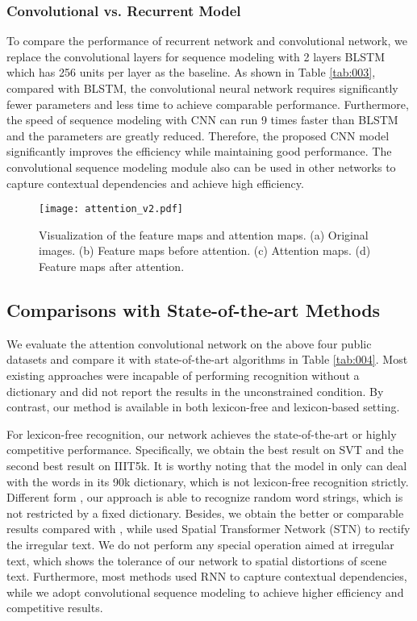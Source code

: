 \documentclass[letterpaper]{article} %
\begin{document}
\subsubsection{Convolutional vs. Recurrent Model}
To compare the performance of recurrent network and convolutional network, we replace the convolutional layers for sequence modeling with 2 layers BLSTM which has 256 units per layer as the baseline. As shown in Table \ref{tab:003}, compared with BLSTM, the convolutional neural network requires significantly fewer parameters and less time to achieve comparable performance. Furthermore, the speed of sequence modeling with CNN can run 9 times faster than BLSTM and the parameters are greatly reduced. Therefore, the proposed CNN model significantly improves the efficiency while maintaining good performance. The convolutional sequence modeling module also can be used in other networks to capture contextual dependencies and achieve high efficiency. \par

\begin{figure}
\centering
\texttt{[image: attention\_v2.pdf]}
\caption{Visualization of the feature maps and attention maps. (a) Original images. (b) Feature maps before attention. (c) Attention maps. (d) Feature maps after attention.}
\label{fig:picture003}
\end{figure}





\subsection{Comparisons with State-of-the-art Methods}


We evaluate the attention convolutional network on the above four public datasets and compare it with state-of-the-art algorithms in Table \ref{tab:004}. Most existing approaches were incapable of performing recognition without a dictionary and did not report the results in the unconstrained condition. By contrast, our method is available in both lexicon-free and lexicon-based setting.

For lexicon-free recognition, our network achieves the state-of-the-art or highly competitive performance. Specifically, we obtain the best result on SVT and the second best result on IIIT5k. It is worthy noting that the model in \cite{jaderberg2016reading} only can deal with the words in its 90k dictionary, which is not lexicon-free recognition strictly. Different form \cite{jaderberg2016reading}, our approach is able to recognize random word strings, which is not restricted by a fixed dictionary. Besides, we obtain the better or comparable results compared with \cite{shi2016robust}, while \cite{shi2016robust} used Spatial Transformer Network (STN) to rectify the irregular text. We do not perform any special operation aimed at irregular text, which shows the tolerance of our network to spatial distortions of scene text. Furthermore, most methods used RNN to capture contextual dependencies, while we adopt convolutional sequence modeling to achieve higher efficiency and competitive results. \par
\end{document}
